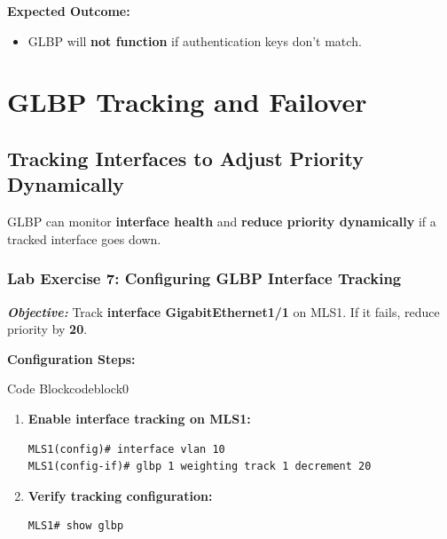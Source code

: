 \documentclass[a4paper]{book}
\begin{document}
\textbf{Expected Outcome:}
\begin{itemize}
\item GLBP will \textbf{not function} if authentication keys don’t match.
\end{itemize}


\vspace{1em}

\section{GLBP Tracking and Failover}

\subsection{Tracking Interfaces to Adjust Priority Dynamically}
GLBP can monitor \textbf{interface health} and \textbf{reduce priority dynamically} if a 
tracked interface goes down.

\subsubsection{Lab Exercise 7: Configuring GLBP Interface Tracking}
\textbf{\textit{Objective:}} Track \textbf{interface GigabitEthernet1/1} on MLS1. If it fails, 
reduce priority by \textbf{20}.
\vspace{1.5em}

\textbf{Configuration Steps:}

\vspace{1.5em}


\begin{ocg}{Code Block}{codeblock}{0}

\vspace{0.5cm}


\begin{enumerate}
\item \textbf{Enable interface tracking on MLS1:}
\begin{lstlisting}
MLS1(config)# interface vlan 10
MLS1(config-if)# glbp 1 weighting track 1 decrement 20
\end{lstlisting}

\item \textbf{Verify tracking configuration:}
\begin{lstlisting}
MLS1# show glbp
\end{lstlisting}
\end{enumerate}
\end{ocg}
\end{document}
